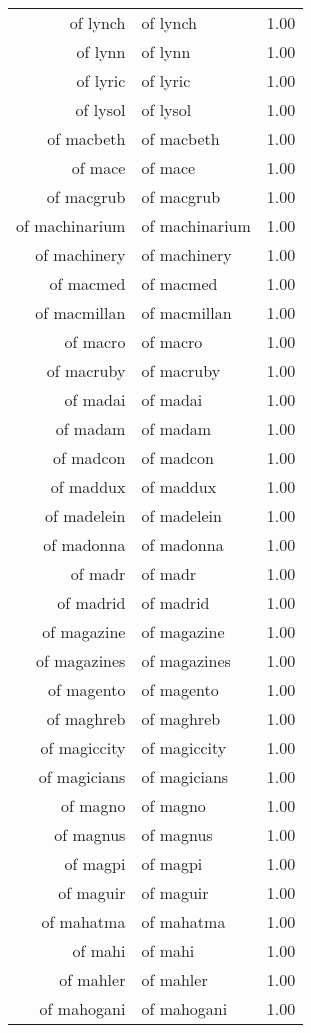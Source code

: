 \begin{table}[ht]
\begin{tabular}{rlr}
  of lynch & of lynch & 1.00 \\ 
  of lynn & of lynn & 1.00 \\ 
  of lyric & of lyric & 1.00 \\ 
  of lysol & of lysol & 1.00 \\ 
  of macbeth & of macbeth & 1.00 \\ 
  of mace & of mace & 1.00 \\ 
  of macgrub & of macgrub & 1.00 \\ 
  of machinarium & of machinarium & 1.00 \\ 
  of machinery & of machinery & 1.00 \\ 
  of macmed & of macmed & 1.00 \\ 
  of macmillan & of macmillan & 1.00 \\ 
  of macro & of macro & 1.00 \\ 
  of macruby & of macruby & 1.00 \\ 
  of madai & of madai & 1.00 \\ 
  of madam & of madam & 1.00 \\ 
  of madcon & of madcon & 1.00 \\ 
  of maddux & of maddux & 1.00 \\ 
  of madelein & of madelein & 1.00 \\ 
  of madonna & of madonna & 1.00 \\ 
  of madr & of madr & 1.00 \\ 
  of madrid & of madrid & 1.00 \\ 
  of magazine & of magazine & 1.00 \\ 
  of magazines & of magazines & 1.00 \\ 
  of magento & of magento & 1.00 \\ 
  of maghreb & of maghreb & 1.00 \\ 
  of magiccity & of magiccity & 1.00 \\ 
  of magicians & of magicians & 1.00 \\ 
  of magno & of magno & 1.00 \\ 
  of magnus & of magnus & 1.00 \\ 
  of magpi & of magpi & 1.00 \\ 
  of maguir & of maguir & 1.00 \\ 
  of mahatma & of mahatma & 1.00 \\ 
  of mahi & of mahi & 1.00 \\ 
  of mahler & of mahler & 1.00 \\ 
  of mahogani & of mahogani & 1.00 \\ 

\end{tabular}
\end{table}
